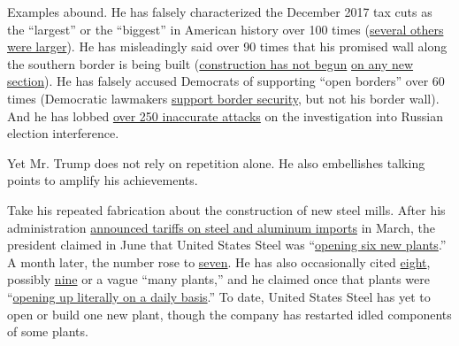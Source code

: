 Examples abound. He has falsely characterized the December 2017 tax cuts
as the ``largest'' or the ``biggest'' in American history over 100 times
(\href{https://www.nytimes3xbfgragh.onion/2017/11/29/us/politics/fact-check-trump-tax-cuts.html}{several
others were larger}). He has misleadingly said over 90 times that his
promised wall along the southern border is being built
(\href{https://www.nytimes3xbfgragh.onion/2018/12/11/us/politics/fact-check-trump-border-wall.html}{construction
has not begun}
\href{https://www.nytimes3xbfgragh.onion/2018/05/11/us/politics/trump-misleadingly-says-construction-has-already-begun-on-his-border-wall.html}{on
any new section}). He has falsely accused Democrats of supporting ``open
borders'' over 60 times (Democratic lawmakers
\href{https://www.nytimes3xbfgragh.onion/2018/06/27/us/politics/fast-check-donald-trump-democrats-open-borders.html}{support
border security}, but not his border wall). And he has lobbed
\href{https://www.nytimes3xbfgragh.onion/2018/08/18/us/politics/fact-check-trump-russia-election-interference-.html}{over
250 inaccurate attacks} on the investigation into Russian election
interference.

Yet Mr. Trump does not rely on repetition alone. He also embellishes
talking points to amplify his achievements.

Take his repeated fabrication about the construction of new steel mills.
After his administration
\href{https://www.nytimes3xbfgragh.onion/2018/03/01/business/trump-tariffs.html}{announced
tariffs on steel and aluminum imports} in March, the president claimed
in June that United States Steel was
``\href{https://www.nytimes3xbfgragh.onion/2018/06/28/us/politics/fact-check-trump-north-dakota-rally.html}{opening
six new plants}.'' A month later, the number rose to
\href{https://www.whitehouse.gov/briefings-statements/remarks-president-trump-economy/}{seven}.
He has also occasionally cited
\href{https://www.whitehouse.gov/briefings-statements/remarks-president-trump-signing-executive-order-strengthening-retirement-security-america/}{eight},
possibly
\href{https://www.whitehouse.gov/briefings-statements/remarks-president-trump-united-states-mexico-canada-agreement/}{nine}
or a vague ``many plants,'' and he claimed once that plants were
``\href{https://www.whitehouse.gov/briefings-statements/remarks-president-trump-dinner-business-leaders/}{opening
up literally on a daily basis}.'' To date, United States Steel has yet
to open or build one new plant, though the company has restarted idled
components of some plants.

